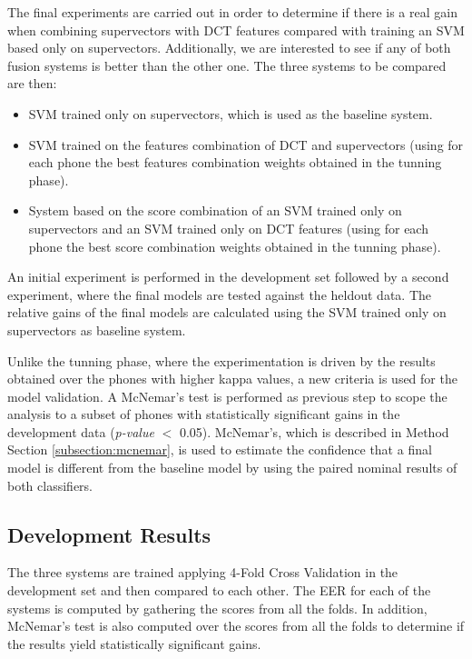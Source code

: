 The final experiments are carried out in order
to determine if there is a real gain when combining
supervectors with DCT features compared with training an SVM based only on supervectors.
Additionally, we are interested to see if any of both fusion systems is better
than the other one. The three systems to be compared are then:

\begin{itemize}
	\item SVM trained only on supervectors, which is used as the baseline system.
	\item SVM trained on the features combination of DCT and supervectors (using for each phone the best features combination weights obtained in the tunning phase).
	\item System based on the score combination of an SVM trained
	only on supervectors and an SVM trained
	only on DCT features (using for each phone the best score combination weights obtained in the tunning phase).
\end{itemize}

An initial experiment is performed in the development set
followed by a second experiment, where
the final models are tested against the heldout data.
The relative gains of the final models
are calculated using the SVM trained only on supervectors as baseline system.

Unlike the tunning phase, where the experimentation is driven by the results obtained
over the phones with higher kappa values, a new criteria is used for the model validation.
A McNemar's test is performed as previous step to scope the analysis
to a subset of phones with statistically significant gains in the development
data (\textit{p-value} $<$ 0.05).
McNemar's, which is described in Method Section \ref{subsection:mcnemar},
is used to estimate the confidence that a final model is different from
the baseline model by using the paired nominal results of both classifiers.


\subsection{Development Results}

The three systems are trained applying 4-Fold Cross Validation
in the development set and then compared to each other.
The EER for each of
the systems is computed
by gathering the scores from all the folds.
In addition, McNemar's test is also computed
over the scores from all the folds to determine if the
results yield statistically significant gains.

